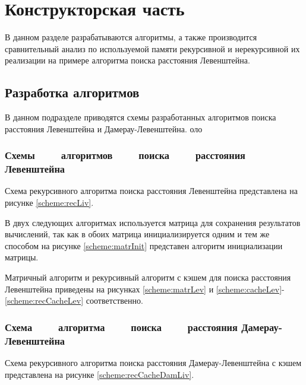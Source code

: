 \chapter{Конструкторская часть}

В данном разделе разрабатываются алгоритмы, а также производится сравнительный
анализ по используемой памяти рекурсивной и нерекурсивной их реализации на
примере алгоритма поиска расстояния Левенштейна.

\section{Разработка алгоритмов}

В данном подразделе приводятся схемы разработанных алгоритмов поиска расстояния
Левенштейна и Дамерау-Левенштейна.
оло
\subsection[Схемы алгоритмов поиска расстояния Левенштейна]
           {Схемы ~~~~алгоритмов ~~~~поиска ~~~~расстояния Левенштейна}

Схема рекурсивного алгоритма поиска расстояния Левенштейна представлена
на рисунке \ref{scheme:recLiv}.

В двух следующих алгоритмах используется матрица для сохранения результатов
вычислений, так как в обоих матрица инициализируется одним и тем же способом
на рисунке \ref{scheme:matrInit} представен алгоритм инициализации матрицы.

Матричный алгоритм и рекурсивный алгоритм с кэшем для поиска расстояния
Левенштейна приведены на рисунках \ref{scheme:matrLev} и
\ref{scheme:cacheLev}-\ref{scheme:recCacheLev} соответственно.

\subsection[Схема алгоритма поиска расстояния Дамерау-Левенштейна]
           {Схема ~~~~алгоритма ~~~~поиска ~~~~расстояния Дамерау-Левенштейна}

Схема рекурсивного алгоритма поиска расстояния Дамерау-Левенштейна с кэшем
представлена на рисунке \ref{scheme:recCacheDamLiv}.

\noindent
{}
\noindent
{}
\noindent
{}
\noindent
{}
\noindent {}
\noindent
{}

